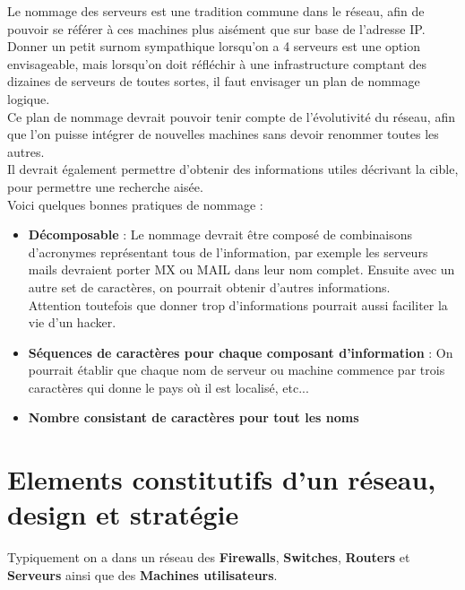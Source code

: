 \documentclass{report}
\begin{document}
		Le nommage des serveurs est une tradition commune dans le réseau, afin de pouvoir se référer à ces machines plus aisément que sur base de l'adresse IP.\\

		Donner un petit surnom sympathique lorsqu'on a 4 serveurs est une option envisageable, mais lorsqu'on doit réfléchir à une infrastructure comptant des dizaines de serveurs de toutes sortes, il faut envisager un plan de nommage logique.\\

		Ce plan de nommage devrait pouvoir tenir compte de l'évolutivité du réseau, afin que l'on puisse intégrer de nouvelles machines sans devoir renommer toutes les autres.\\
		Il devrait également permettre d'obtenir des informations utiles décrivant la cible, pour permettre une recherche aisée.\\

		Voici quelques bonnes pratiques de nommage : \\

		\begin{itemize}
			\item \textbf{Décomposable} : Le nommage devrait être composé de combinaisons d'acronymes représentant tous de l'information, par exemple les serveurs mails devraient porter MX ou MAIL dans leur nom complet. Ensuite avec un autre set de caractères, on pourrait obtenir d'autres informations.\\
			Attention toutefois que donner trop d'informations pourrait aussi faciliter la vie d'un hacker.\\

			\item \textbf{Séquences de caractères pour chaque composant d'information} : On pourrait établir que chaque nom de serveur ou machine commence par trois caractères qui donne le pays où il est localisé, etc...\\

			\item \textbf{Nombre consistant de caractères pour tout les noms}\\
		\end{itemize}

	\section{Elements constitutifs d'un réseau, design et stratégie}

		Typiquement on a dans un réseau des \textbf{Firewalls}, \textbf{Switches}, \textbf{Routers} et \textbf{Serveurs} ainsi que des \textbf{Machines utilisateurs}.\\
\end{document}
